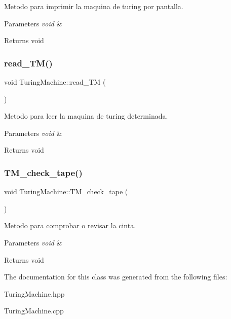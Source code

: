 Metodo para imprimir la maquina de turing por pantalla. 


\begin{DoxyParams}{Parameters}
{\em void} & \\
\hline
\end{DoxyParams}
\begin{DoxyReturn}{Returns}
void 
\end{DoxyReturn}
\hypertarget{class_turing_machine_a7fc1880eaabbe3cae9baccefd5ea5860}{}\label{class_turing_machine_a7fc1880eaabbe3cae9baccefd5ea5860} 
\subsubsection{\texorpdfstring{read\+\_\+\+T\+M()}{read\_TM()}}
{\footnotesize\ttfamily void Turing\+Machine\+::read\+\_\+\+TM (\begin{DoxyParamCaption}\item[{void}]{ }\end{DoxyParamCaption})}



Metodo para leer la maquina de turing determinada. 


\begin{DoxyParams}{Parameters}
{\em void} & \\
\hline
\end{DoxyParams}
\begin{DoxyReturn}{Returns}
void 
\end{DoxyReturn}
\hypertarget{class_turing_machine_ae1ee7856691d4d40a62f2e380e9b87b1}{}\label{class_turing_machine_ae1ee7856691d4d40a62f2e380e9b87b1} 
\subsubsection{\texorpdfstring{T\+M\+\_\+check\+\_\+tape()}{TM\_check\_tape()}}
{\footnotesize\ttfamily void Turing\+Machine\+::\+T\+M\+\_\+check\+\_\+tape (\begin{DoxyParamCaption}\item[{void}]{ }\end{DoxyParamCaption})}



Metodo para comprobar o revisar la cinta. 


\begin{DoxyParams}{Parameters}
{\em void} & \\
\hline
\end{DoxyParams}
\begin{DoxyReturn}{Returns}
void 
\end{DoxyReturn}


The documentation for this class was generated from the following files\+:\begin{DoxyCompactItemize}
\item 
Turing\+Machine.\+hpp\item 
Turing\+Machine.\+cpp\end{DoxyCompactItemize}
